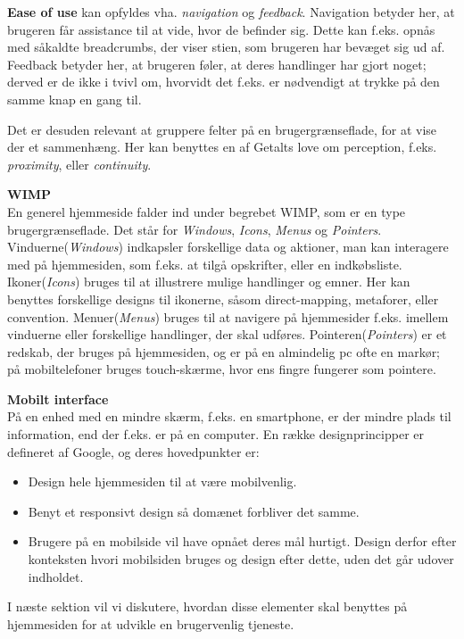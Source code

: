 \textbf{Ease of use} kan opfyldes vha. \textit{navigation} og \textit{feedback}.
Navigation betyder her, at brugeren får assistance til at vide, hvor de befinder sig.
Dette kan f.eks. opnås med såkaldte breadcrumbs, der viser stien, som brugeren har bevæget sig ud af.
Feedback betyder her, at brugeren føler, at deres handlinger har gjort noget; derved er de ikke i tvivl om, hvorvidt det f.eks. er nødvendigt at trykke på den samme knap en gang til.

Det er desuden relevant at gruppere felter på en brugergrænseflade, for at vise der et sammenhæng. 
Her kan benyttes en af Getalts love om perception, f.eks. \textit{proximity}, eller \textit{continuity}.\citep{DIS2014}

\textbf{WIMP}\hfill\\
En generel hjemmeside falder ind under begrebet WIMP, som er en type brugergrænseflade.
Det står for \textit{Windows}, \textit{Icons}, \textit{Menus} og \textit{Pointers}.
Vinduerne(\textit{Windows}) indkapsler forskellige data og aktioner, man kan interagere med på hjemmesiden, som f.eks. at tilgå opskrifter, eller en indkøbsliste.
Ikoner(\textit{Icons}) bruges til at illustrere mulige handlinger og emner.
Her kan benyttes forskellige designs til ikonerne, såsom direct-mapping, metaforer, eller convention.
Menuer(\textit{Menus}) bruges til at navigere på hjemmesider f.eks. imellem vinduerne eller forskellige handlinger, der skal udføres.
Pointeren(\textit{Pointers}) er et redskab, der bruges på hjemmesiden, og er på en almindelig pc ofte en markør; på mobiltelefoner bruges touch-skærme, hvor ens fingre fungerer som pointere.

\textbf{Mobilt interface}\hfill\\
På en enhed med en mindre skærm, f.eks. en smartphone, er der mindre plads til information, end der f.eks. er på en computer. 
En række designprincipper er defineret af Google\citep{Mobil}, og deres hovedpunkter er:
\begin{itemize}[nolistsep,noitemsep]
	\item Design hele hjemmesiden til at være mobilvenlig.
	\item Benyt et responsivt design så domænet forbliver det samme.
	\item Brugere på en mobilside vil have opnået deres mål hurtigt. 
	Design derfor efter konteksten hvori mobilsiden bruges og design efter dette, uden det går udover indholdet.
\end{itemize}

I næste sektion vil vi diskutere, hvordan disse elementer skal benyttes på hjemmesiden for at udvikle en brugervenlig tjeneste.

